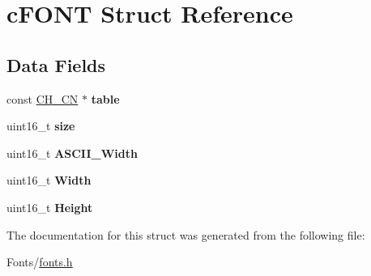 \hypertarget{structc_f_o_n_t}{}\section{c\+F\+O\+NT Struct Reference}
\label{structc_f_o_n_t}
\subsection*{Data Fields}
\begin{DoxyCompactItemize}
\item 
\mbox{\label{structc_f_o_n_t_aa4095c7d00a422db9dc6ca41770b0d3a}} 
const \mbox{\hyperlink{struct_c_h___c_n}{C\+H\+\_\+\+CN}} $\ast$ {\bfseries table}
\item 
\mbox{\label{structc_f_o_n_t_aaba88b24a21a6c70c895c0d55f4a69a0}} 
uint16\+\_\+t {\bfseries size}
\item 
\mbox{\label{structc_f_o_n_t_add7b9f620cc5afb0e43d728cad2e5d31}} 
uint16\+\_\+t {\bfseries A\+S\+C\+I\+I\+\_\+\+Width}
\item 
\mbox{\label{structc_f_o_n_t_a9b3fe5d83fe7eb60cd86008934f65616}} 
uint16\+\_\+t {\bfseries Width}
\item 
\mbox{\label{structc_f_o_n_t_a1a634e0d0d740b55406a6c2c194a7bfc}} 
uint16\+\_\+t {\bfseries Height}
\end{DoxyCompactItemize}


The documentation for this struct was generated from the following file\+:\begin{DoxyCompactItemize}
\item 
Fonts/\mbox{\hyperlink{fonts_8h}{fonts.\+h}}\end{DoxyCompactItemize}
